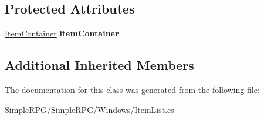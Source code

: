 \subsection*{Protected Attributes}
\begin{DoxyCompactItemize}
\item 
\hypertarget{class_simple_r_p_g_1_1_windows_1_1_item_list_a85d047fe8d365e9be51af2f59dc47782}{\hyperlink{class_simple_r_p_g_1_1_items_1_1_item_container}{Item\-Container} {\bfseries item\-Container}}\label{class_simple_r_p_g_1_1_windows_1_1_item_list_a85d047fe8d365e9be51af2f59dc47782}

\end{DoxyCompactItemize}
\subsection*{Additional Inherited Members}


The documentation for this class was generated from the following file\-:\begin{DoxyCompactItemize}
\item 
Simple\-R\-P\-G/\-Simple\-R\-P\-G/\-Windows/Item\-List.\-cs\end{DoxyCompactItemize}
